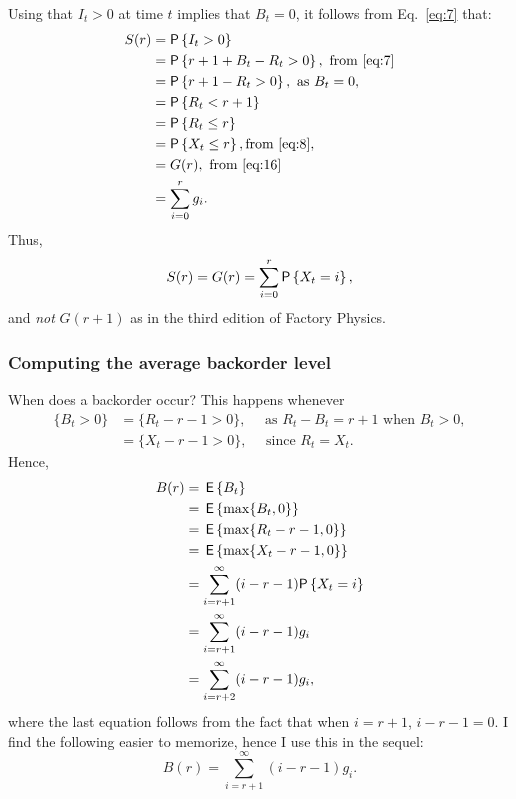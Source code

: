 Using that $I_t>0$ at time $t$ implies that $B_t = 0$,
it follows from Eq.~\eqref{eq:7} that:
\begin{equation}\label{eq:10}
  \begin{split}
   S(r) &= \P{I_t >0} \\
   &= \P{r+1 + B_t - R_t >0}, \text{  from  \eqref{eq:7}}  \\
   &= \P{r+1 - R_t >0}, \text{ as } B_t = 0, \\
   &= \P{R_t < r+1} \\
   &= \P{R_t \leq r} \\
   & = \P{X_t \leq  r}, \text{from  \eqref{eq:8}}, \\
   &= G(r),  \text{ from \eqref{eq:16}} \\
   &=  \sum_{i=0}^{r} g_i.
  \end{split}
\end{equation}
Thus,
\begin{equation}
  \label{eq:13}
   S(r) = G(r) = \sum_{i=0}^r \P{X_t = i},
\end{equation}
and \emph{not} $G(r+1)$ as in the third edition of Factory Physics.

\subsubsection{Computing the average backorder level}


When does a backorder occur? This happens whenever
\begin{equation}
  \label{eq:11}
  \begin{split}
   \{B_t > 0\} 
&= \{R_t - r-1>0\}, \quad \text{ as } R_t - B_t = r+1\text{ when } B_t >0, \\
&= \{X_t - r-1>0\},\quad \text{ since  } R_t  = X_t.
  \end{split}
\end{equation}
Hence,
\begin{equation*}
   \begin{split}
     B(r) 
   &= \E{B_t} \\
   &= \E{\max\{B_t, 0\}} \\
   &= \E{\max\{R_t - r - 1, 0\}} \\
   &= \E{\max\{X_t - r - 1, 0\}} \\
   &= \sum_{i=r+1}^\infty (i- r -1)\P{X_t = i}\\
   &= \sum_{i=r+1}^\infty (i- r -1)g_i \\
   &= \sum_{i=r+2}^\infty (i- r -1)g_i,
     \end{split}
\end{equation*}
where the last equation follows from the fact that when $i=r+1$,
$i-r-1 =0$. I find the following easier to memorize, hence I use this
in the sequel:
\begin{equation}
  \label{eq:12}
   B(r)  = \sum_{i=r+1}^\infty (i- r -1)g_i.
\end{equation}

